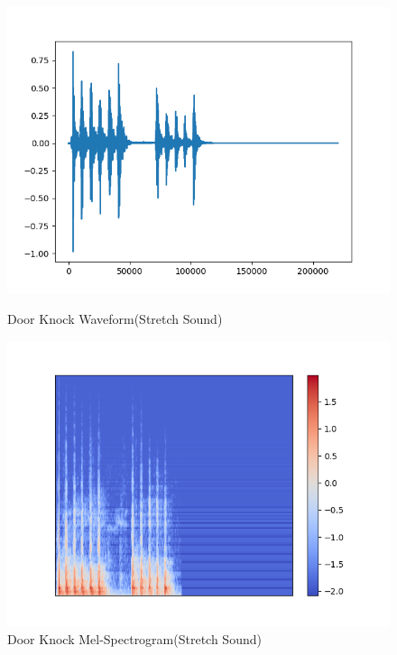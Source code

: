 \begin{figure}[H]
\begin{minipage}[t]{0.5\textwidth}
\centering
\includegraphics[width=\textwidth]{./graph/door_wood_knock_StretchSound_wave.png} 
\caption{Door Knock Waveform(Stretch Sound)}
\label{SSwave}
\end{minipage}
\begin{minipage}[t]{0.5\textwidth}
\centering
\includegraphics[width=\textwidth]{./graph/door_wood_knock_StretchSound_melsp.png} 
\caption{Door Knock Mel-Spectrogram(Stretch Sound)}
\label{SSsp}
\end{minipage}
\end{figure}
